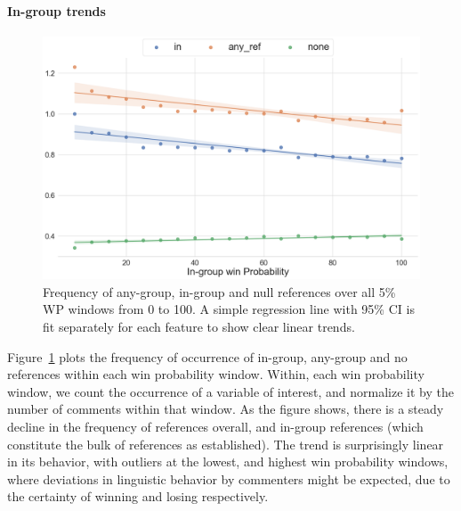 \paragraph{In-group trends}

\begin{figure}[t]
    \centering
    \includegraphics[width=\linewidth]{figures/trends-1.png}
    \caption{Frequency of any-group, in-group and null references over all 5\% WP windows from 0 to 100. A simple regression line with 95\% CI is fit separately for each feature to show clear linear trends.}
    \label{fig:trends-1}
\end{figure}

Figure~\ref{fig:trends-1} plots the frequency of occurrence of in-group, any-group and no references within each win probability window. Within, each win probability window, we count the occurrence of a variable of interest, and normalize it by the number of comments within that window. As the figure shows, there is a steady decline in the frequency of references overall, and in-group references (which constitute the bulk of references as established). The trend is surprisingly linear in its behavior, with outliers at the lowest, and highest win probability windows, where deviations in linguistic behavior by commenters might be expected, due to the certainty of winning and losing respectively.

